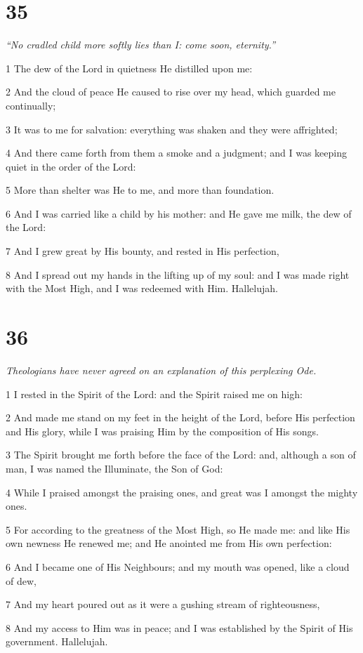 \chapter{35}

\par \textit{“No cradled child more softly lies than I: come soon, eternity.”}

\par 1 The dew of the Lord in quietness He distilled upon me:
\par 2 And the cloud of peace He caused to rise over my head, which guarded me continually;
\par 3 It was to me for salvation: everything was shaken and they were affrighted;
\par 4 And there came forth from them a smoke and a judgment; and I was keeping quiet in the order of the Lord:
\par 5 More than shelter was He to me, and more than foundation.
\par 6 And I was carried like a child by his mother: and He gave me milk, the dew of the Lord:
\par 7 And I grew great by His bounty, and rested in His perfection,
\par 8 And I spread out my hands in the lifting up of my soul: and I was made right with the Most High, and I was redeemed with Him. Hallelujah.

\chapter{36}

\par \textit{Theologians have never agreed on an explanation of this perplexing Ode.}

\par 1 I rested in the Spirit of the Lord: and the Spirit raised me on high:
\par 2 And made me stand on my feet in the height of the Lord, before His perfection and His glory, while I was praising Him by the composition of His songs.
\par 3 The Spirit brought me forth before the face of the Lord: and, although a son of man, I was named the Illuminate, the Son of God:
\par 4 While I praised amongst the praising ones, and great was I amongst the mighty ones.
\par 5 For according to the greatness of the Most High, so He made me: and like His own newness He renewed me; and He anointed me from His own perfection:
\par 6 And I became one of His Neighbours; and my mouth was opened, like a cloud of dew,
\par 7 And my heart poured out as it were a gushing stream of righteousness,
\par 8 And my access to Him was in peace; and I was established by the Spirit of His government. Hallelujah.

